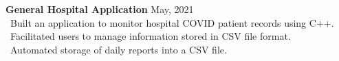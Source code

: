 {\textbf{General Hospital Application} \hfill {May, 2021} \\
\hspace*{4pt} \textbullet~{Built an application to monitor hospital COVID patient records using C++.} \\
\hspace*{4pt} \textbullet~{Facilitated users to manage information stored in CSV file format.} \\
\hspace*{4pt} \textbullet~{Automated storage of daily reports into a CSV file.}} \\
